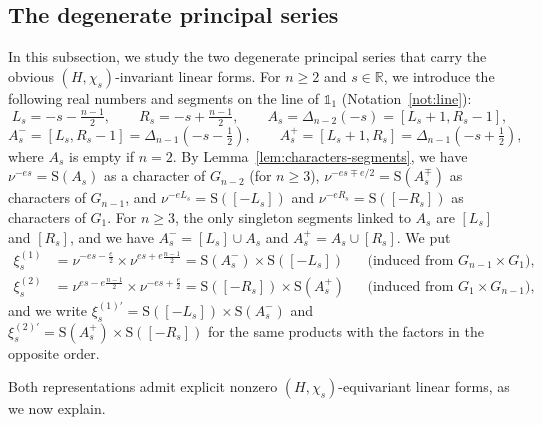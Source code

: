 \documentclass[11pt]{amsart}
\numberwithin{equation}{section}
\theoremstyle{plain}
\theoremstyle{definition}
\theoremstyle{remark}
\newcommand{\R}{\mathbb{R}}
\newcommand{\one}{\mathds{1}}
\newcommand{\xione}{\xi^{(1)}}
\newcommand{\xitwo}{\xi^{(2)}}
\newcommand{\Ss}{\mathrm{S}}
\begin{document}
\subsection{The degenerate principal series}\label{ss:dps}

In this subsection, we study the two degenerate principal series that carry the obvious $(H,\chi_s)$-invariant linear forms. For $n\ge2$ and $s\in\R$, we introduce the following real numbers and segments on the line of $\one_1$ (Notation~\ref{not:line}):
$$
L_s=-s-\tfrac{n-1}2,\qquad R_s=-s+\tfrac{n-1}2,\qquad A_s=\Delta_{n-2}(-s)=[L_s+1,R_s-1],
$$
$$
A_s^-=[L_s,R_s-1]=\Delta_{n-1}(-s-\tfrac12),\qquad A_s^+=[L_s+1,R_s]=\Delta_{n-1}(-s+\tfrac12),
$$
where $A_s$ is empty if $n=2$. By Lemma~\ref{lem:characters-segments}, we have $\nu^{-es}=\Ss(A_s)$ as a character of $G_{n-2}$ (for $n\ge3$), $\nu^{-es\mp e/2}=\Ss(A_s^\mp)$ as characters of $G_{n-1}$, and $\nu^{-eL_s}=\Ss([-L_s])$ and $\nu^{-eR_s}=\Ss([-R_s])$ as characters of $G_1$. For $n\ge3$, the only singleton segments linked to $A_s$ are $[L_s]$ and $[R_s]$, and we have $A_s^-=[L_s]\cup A_s$ and $A_s^+=A_s\cup[R_s]$. We put
\begin{align*}
	\xione_s&=\nu^{-es-\frac e2}\times\nu^{es+e\frac{n-1}2}=\Ss(A_s^-)\times\Ss([-L_s])&&\text{(induced from }G_{n-1}\times G_1),\\
	\xitwo_s&=\nu^{es-e\frac{n-1}2}\times\nu^{-es+\frac e2}=\Ss([-R_s])\times\Ss(A_s^+)&&\text{(induced from }G_1\times G_{n-1}),
\end{align*}
and we write $\xi^{(1)\prime}_s=\Ss([-L_s])\times\Ss(A_s^-)$ and $\xi^{(2)\prime}_s=\Ss(A_s^+)\times\Ss([-R_s])$ for the same products with the factors in the opposite order.

Both representations admit explicit nonzero $(H,\chi_s)$-equivariant linear forms, as we now explain.
\end{document}
